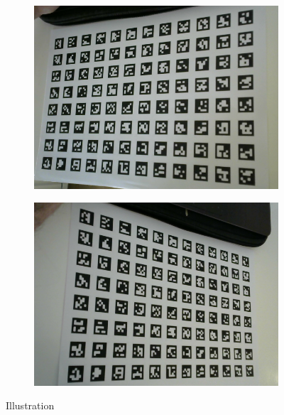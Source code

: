 \documentclass[../Head/report.tex]{subfiles}
\begin{document}
\begin{figure}[H]
     \hspace{0.2em}
    \begin{subfigure}[t]{.22\textwidth}
        \centering
        \includegraphics[width=\textwidth]{../Figures//camera_calibration/4.png}
        \caption{}
        \label{fig:gazebo_landing_board_two}
    \end{subfigure}
         \hspace{0.2em}
    \begin{subfigure}[t]{.22\textwidth}
        \centering
        \includegraphics[width=\textwidth]{../Figures/camera_calibration/5.png}
        \caption{}
        \label{fig:gazebo_landing_board_three}
    \end{subfigure}
    \caption{Illustration }  
    \label{fig:gazebo_aruco_marker_boards}
\end{figure}    
\end{document}
